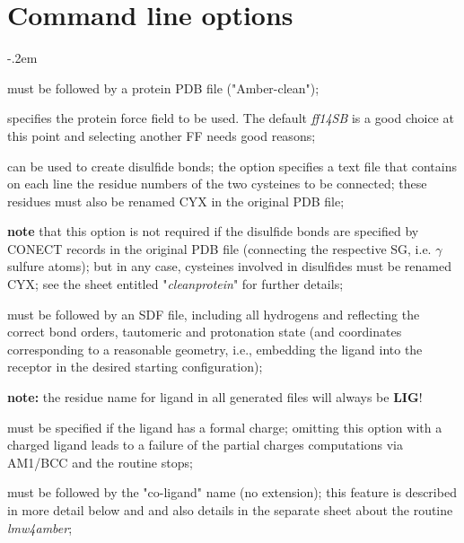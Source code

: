 \documentclass[10pt,landscape,twocolumn]{article}
\begin{document}
\section{Command line options}
\begin{description}
\itemsep-.2em 

\item[\textbf{\texttt{--prot}}]  must be followed by a protein PDB file ("Amber-clean");

\item[\textbf{\texttt{--pfrc}}] specifies the protein force field to be used. The default \textsl{ff14SB} is a good choice at this point and selecting another FF needs good reasons;

\item[\textbf{\texttt{--disul}}] can be used to create disulfide bonds; the option specifies a text file that contains on each line the residue numbers of the two cysteines to be connected; these residues must also be renamed CYX in the original PDB file; 
\begin{mdframed}
\textbf{note} that this option is not required if the disulfide bonds are specified by CONECT records in the original PDB file (connecting the respective SG, i.e. $\gamma$ sulfure atoms); but in any case, cysteines involved in disulfides must be renamed CYX; see the sheet entitled "\textsl{cleanprotein}" for further details;
\end{mdframed}
\newpage
\item[\textbf{\texttt{--lig}}]  must be followed by an SDF file, including all hydrogens and reflecting the correct bond orders, tautomeric and protonation state (and coordinates corresponding to a reasonable geometry, i.e., embedding the ligand into the receptor in the desired starting configuration); \begin{mdframed}\textbf{note:} the residue name for ligand in all generated files will always be \textbf{LIG}!\end{mdframed}

\item[\textbf{\texttt{--chrg}}] must be specified if the ligand has a formal charge; omitting this option with a charged ligand leads to a failure of the partial charges computations via AM1/BCC and the routine stops;

\item[\textbf{\texttt{--colig}}] must be followed by the "co-ligand" name (no extension); this feature is described in more detail below and and also details in the separate sheet about the routine \textsl{lmw4amber};


\end{description}
\end{document}
